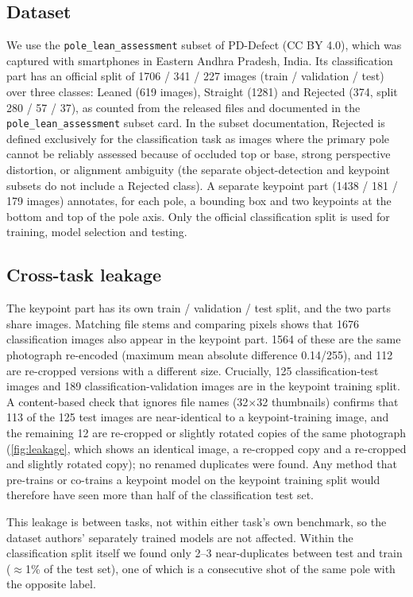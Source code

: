 \documentclass[11pt]{article}
\begin{document}
\subsection{Dataset}
We use the \texttt{pole\_lean\_assessment} subset of PD-Defect \citep{pddefect_data} (CC BY 4.0), which was
captured with smartphones in Eastern Andhra Pradesh, India. Its classification part has an official split of
1706 / 341 / 227 images (train / validation / test) over three classes: Leaned (619 images), Straight (1281)
and Rejected (374, split 280 / 57 / 37), as counted from the released files and documented in the
\texttt{pole\_lean\_assessment} subset card. In the subset documentation, Rejected is defined exclusively for
the classification task as images where the primary pole cannot be reliably assessed because of occluded top or base, strong perspective distortion, or alignment ambiguity (the separate object-detection and keypoint subsets do not include a Rejected class). A separate keypoint part
(1438 / 181 / 179 images) annotates, for each pole, a bounding box and two keypoints at the bottom and top of
the pole axis. Only the official classification split is used for training, model selection and testing.

\subsection{Cross-task leakage}
\label{sec:leakage}
The keypoint part has its own train / validation / test split, and the two parts share images. Matching
file stems and comparing pixels shows that 1676 classification images also appear in the keypoint part.
1564 of these are the same photograph re-encoded (maximum mean absolute difference 0.14/255), and 112 are
re-cropped versions with a different size. Crucially, 125 classification-test images and 189
classification-validation images are in the keypoint training split. A content-based check that ignores
file names (32$\times$32 thumbnails) confirms that 113 of the 125 test images are near-identical to a
keypoint-training image, and the remaining 12 are re-cropped or slightly rotated copies of the same photograph
(\cref{fig:leakage}, which shows an identical image, a re-cropped copy and a re-cropped and slightly
rotated copy); no renamed duplicates were found. Any method that pre-trains or co-trains a keypoint
model on the keypoint training split would therefore have seen more than half of the classification test set.

This leakage is between tasks, not within either task's own benchmark, so the dataset authors' separately
trained models are not affected. Within the classification split itself we found only 2--3 near-duplicates
between test and train ($\approx$1\% of the test set), one of which is a consecutive shot of the same pole
with the opposite label.
\end{document}
